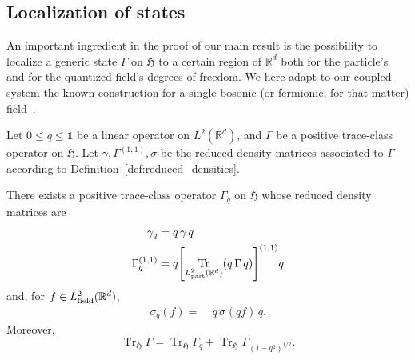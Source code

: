 \documentclass[10pt]{amsart}
\theoremstyle{definition}\newtheorem{defi}[theo]{Definition}\newtheorem{rema}[theo]{Remark}\newtheorem{exam}[theo]{Example}\newtheorem{exem}[theo]{Example}\newtheorem{nota}[theo]{Notation}
\DeclareMathOperator{\Tr}{Tr}
\DeclareMathOperator{\partt}{part}
\DeclareMathOperator{\field}{field}
\newcommand{\R}{\mathbb{R}}
\newcommand{\gH}{\mathfrak{H}}
\newcommand{\1}{\mathds{1}}
\let\oldin\in
\renewcommand{\in}{\mathchoice{\oldin}{\oldin}{\,\oldin\,}{\,\oldin\,}}
\let\originalleft\left
\let\originalright\right
\renewcommand{\left}{\mathopen{}\mathclose\bgroup\originalleft}
\renewcommand{\right}{\aftergroup\egroup\originalright}
\begin{document}
\subsection{Localization of states}

An important ingredient in the proof of our main result is the possibility to localize a generic state $\Gamma$ on $ \gH$ to a certain region of $\R^d$ both for the particle's and for the quantized field's degrees of freedom. We here adapt to our coupled system the known construction for a single bosonic (or fermionic, for that matter) field~\cite{Ammari-04,DerGer-99,HaiLewSol-09a,HaiLewSol-09b,Lewin-11}.

\begin{prop} \label{prop:def_localization}
Let $0\le q \le \1$ be a linear operator on $L^2(\R^d)$, and $\Gamma$ be a positive trace-class operator on $ \gH$. Let $\gamma,\Gamma^{(1,1)},\sigma$ be the reduced density matrices associated to $\Gamma$ according to Definition~\ref{def:reduced_densities}.

There exists a positive trace-class operator $\Gamma_{q}$ on $ \gH$ whose reduced density matrices are
\begin{align}\label{eq:localized_density_particle}
\gamma_q=\;&q\,\gamma\,q\\
\Gamma_q^{(1,1)}=\;&q\left[\Tr_{L^2_{\partt}(\R^d)} \left(q \,\Gamma\, q\right) \right]^{(1,1)}q \label{eq:localized_density_field}
\end{align}
and, for $f\in L^2_{\field}(\R^d)$,
\begin{align}\label{eq:localized_density_interaction}
\sigma_{q}(f)=\;& q \,\sigma_{}(q f)\, q.
\end{align}
Moreover,
\begin{equation}\label{eq:localized_traces}
\Tr_{ \gH} \Gamma = \Tr_{ \gH} \Gamma_q+\Tr_{ \gH}\Gamma_{(1-q^2)^{1/2}}.
\end{equation}
\end{prop}
\end{document}
